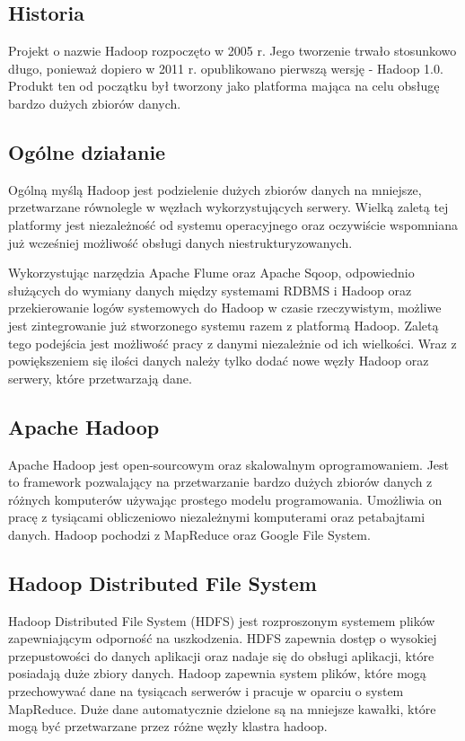 \documentclass[10pt,twocolumn]{llncs}          %
\begin{document}
\subsection{Historia}
\label{ssub:hadoop_historia}
Projekt o nazwie Hadoop rozpoczęto w 2005 r. Jego tworzenie trwało stosunkowo długo, ponieważ dopiero  w 2011 r. opublikowano pierwszą wersję - Hadoop 1.0. Produkt ten od początku był tworzony jako platforma mająca na celu obsługę bardzo dużych zbiorów danych. 

\subsection{Ogólne działanie}
\label{ssub:ogolne_dzialanie}
Ogólną myślą Hadoop jest podzielenie dużych zbiorów danych na mniejsze, przetwarzane równolegle w węzłach wykorzystujących serwery. Wielką zaletą tej platformy jest niezależność od systemu operacyjnego oraz oczywiście wspomniana już wcześniej możliwość obsługi danych niestrukturyzowanych.

Wykorzystując narzędzia Apache Flume oraz Apache Sqoop, odpowiednio służących do wymiany danych między systemami RDBMS i Hadoop oraz przekierowanie logów systemowych do Hadoop w czasie rzeczywistym, możliwe jest zintegrowanie już stworzonego systemu razem z platformą Hadoop. Zaletą tego podejścia jest możliwość pracy z danymi niezależnie od ich wielkości. Wraz z powiększeniem się ilości danych należy tylko dodać nowe węzły Hadoop oraz serwery, które przetwarzają dane.

\subsection{Apache Hadoop}
\label{ssub:apache_hadoop}
Apache Hadoop jest open-sourcowym oraz skalowalnym oprogramowaniem. Jest to framework pozwalający na przetwarzanie bardzo dużych zbiorów danych z różnych komputerów używając prostego modelu programowania. Umożliwia on pracę z tysiącami obliczeniowo niezależnymi komputerami oraz petabajtami danych. Hadoop pochodzi z MapReduce oraz Google File System.

\subsection{Hadoop Distributed File System}
\label{ssub:hdfs}
Hadoop Distributed File System (HDFS) jest rozproszonym systemem plików zapewniającym odporność na uszkodzenia. HDFS zapewnia dostęp o wysokiej przepustowości do danych aplikacji oraz nadaje się do obsługi aplikacji, które posiadają duże zbiory danych. Hadoop zapewnia system plików, które mogą przechowywać dane na tysiącach serwerów i pracuje w oparciu o system MapReduce. Duże dane automatycznie dzielone są na mniejsze kawałki, które mogą być przetwarzane przez różne węzły klastra hadoop.
\end{document}
